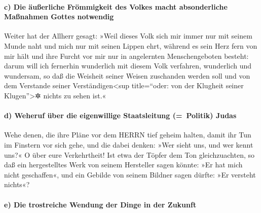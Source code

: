 \hypertarget{c-die-uxe4uuxdferliche-fruxf6mmigkeit-des-volkes-macht-absonderliche-mauxdfnahmen-gottes-notwendig}{%
\paragraph{c) Die äußerliche Frömmigkeit des Volkes macht absonderliche
Maßnahmen Gottes
notwendig}\label{c-die-uxe4uuxdferliche-fruxf6mmigkeit-des-volkes-macht-absonderliche-mauxdfnahmen-gottes-notwendig}}

Weiter hat der Allherr gesagt: »Weil dieses Volk sich mir
immer nur mit seinem Munde naht und mich nur mit seinen Lippen ehrt,
während es sein Herz fern von mir hält und ihre Furcht vor mir nur in
angelernten Menschengeboten besteht: darum will ich
fernerhin wunderlich mit diesem Volk verfahren, wunderlich und
wundersam, so daß die Weisheit seiner Weisen zuschanden werden soll und
von dem Verstande seiner Verständigen\textless sup title=``oder: von der
Klugheit seiner Klugen''\textgreater✲ nichts zu sehen ist.«

\hypertarget{d-weheruf-uxfcber-die-eigenwillige-staatsleitung-politik-judas}{%
\paragraph{d) Weheruf über die eigenwillige Staatsleitung (=~Politik)
Judas}\label{d-weheruf-uxfcber-die-eigenwillige-staatsleitung-politik-judas}}

Wehe denen, die ihre Pläne vor dem HERRN tief geheim
halten, damit ihr Tun im Finstern vor sich gehe, und die dabei denken:
»Wer sieht uns, und wer kennt uns?« O über eure
Verkehrtheit! Ist etwa der Töpfer dem Ton gleichzuachten, so daß ein
hergestelltes Werk von seinem Hersteller sagen könnte: »Er hat mich
nicht geschaffen«, und ein Gebilde von seinem Bildner sagen dürfte: »Er
versteht nichts«?

\hypertarget{e-die-trostreiche-wendung-der-dinge-in-der-zukunft}{%
\paragraph{e) Die trostreiche Wendung der Dinge in der
Zukunft}\label{e-die-trostreiche-wendung-der-dinge-in-der-zukunft}}

